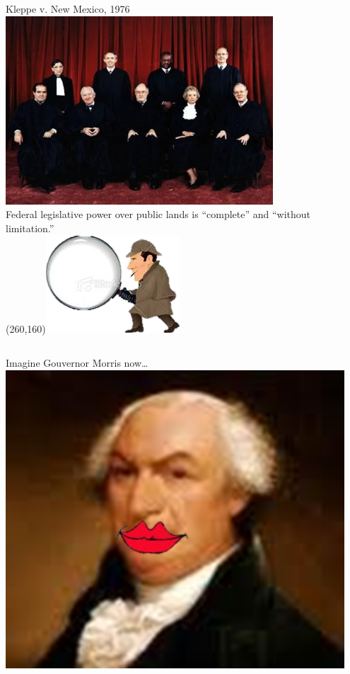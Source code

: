 \begin{frame}{Kleppe v. New Mexico, 1976}
    \centering
    \includegraphics[width=0.75\textwidth]{img/sc-1976.png} \\
    { \large Federal legislative power over public lands is ``complete'' and
    ``without limitation.'' \\ }
    \Put(260,160){\includegraphics[width=.2\textwidth]{img/sherlock.png}}
\end{frame}

\begin{frame}
    \begin{columns}[onlytextwidth]
            { \large Imagine Gouvernor Morris now\ldots }
            \centering
            \includegraphics[width=0.95\textwidth]{img/morris-smile.png} \\
    \end{columns}
\end{frame}

